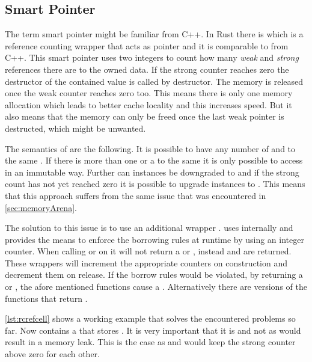 \documentclass[thesis]{subfiles}
\begin{document}
  \subsection{Smart Pointer}
    The term smart pointer might be familiar from C++.
    In Rust there is \RcT which is a reference counting wrapper that acts as pointer and it is comparable to  from C++.
    This smart pointer uses two integers to count how many \emph{weak} and \emph{strong} references there are to the owned data.
    If the strong counter reaches zero the destructor of the contained value is called by \RcTs destructor.
    The memory is released once the weak counter reaches zero too.
    This means there is only one memory allocation which leads to better cache locality and this increases speed.
    But it also means that the memory can only be freed once the last weak pointer is destructed, which might be unwanted.%
    ~\autocite[std::rc::Rc]{rust-doc}

    The semantics of \RcT are the following.
    It is possible to have any number of \RcTs and \WeakTs to the same \T.
    If there is more than one \RcT or a \WeakT to the same \T it is only possible to access \T in an immutable way.
    Further can \RcT instances be downgraded to \WeakT and if the strong count has not yet reached zero it is possible to upgrade \WeakT instances to \RcT.
    This means that this approach suffers from the same issue that was encountered in \autoref{sec:memoryArena}.%
    ~\autocite[std::rc::Rc]{rust-doc}

    The solution to this issue is to use an additional wrapper \RcRefCellT.
    \RefCellT uses internally  and provides the means to enforce the borrowing rules at runtime by using an integer counter.
    When calling  or  on \RefCellT it will not return a  or , instead \RefT and \RefMutT are returned.
    These wrappers will increment the appropriate counters on construction and decrement them on release.
    If the borrow rules would be violated, by returning a \RefT or \RefMutT, the afore mentioned functions cause a \panic.
    Alternatively there are  versions of the functions that return .%
    ~\autocite[std::cell::RefCell]{rust-doc}


    \autoref{lst:rcrefcell} shows a working example that solves the encountered problems so far.
    Now \Node contains a  that stores \WeakT.
    It is very important that it is \WeakT and not \RcT as \RcT would result in a memory leak.
    This is the case as  and  would keep the strong counter above zero for each other.
\end{document}
